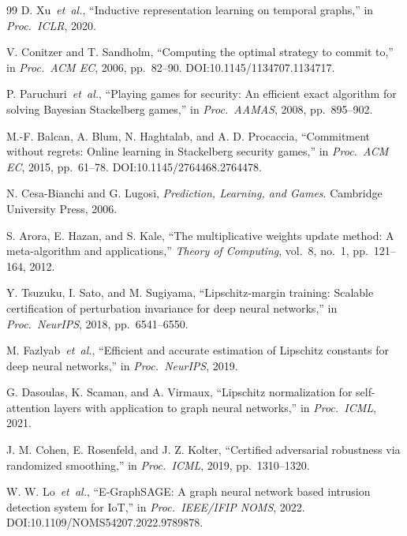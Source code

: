 \documentclass[journal,10pt,twocolumn]{IEEEtran}
\begin{document}
\begin{thebibliography}{99}
 D. Xu~\textit{et~al.}, ``Inductive representation learning on temporal graphs,'' in \textit{Proc.\ ICLR}, 2020.

 V. Conitzer and T. Sandholm, ``Computing the optimal strategy to commit to,'' in \textit{Proc.\ ACM EC}, 2006, pp.~82--90. DOI:10.1145/1134707.1134717.

 P. Paruchuri~\textit{et~al.}, ``Playing games for security: An efficient exact algorithm for solving Bayesian Stackelberg games,'' in \textit{Proc.\ AAMAS}, 2008, pp.~895--902.

 M.-F. Balcan, A. Blum, N. Haghtalab, and A. D. Procaccia, ``Commitment without regrets: Online learning in Stackelberg security games,'' in \textit{Proc.\ ACM EC}, 2015, pp.~61--78. DOI:10.1145/2764468.2764478.

 N. Cesa-Bianchi and G. Lugosi, \textit{Prediction, Learning, and Games}. Cambridge University Press, 2006.

 S. Arora, E. Hazan, and S. Kale, ``The multiplicative weights update method: A meta-algorithm and applications,'' \textit{Theory of Computing}, vol.~8, no.~1, pp.~121--164, 2012.

 Y. Tsuzuku, I. Sato, and M. Sugiyama, ``Lipschitz-margin training: Scalable certification of perturbation invariance for deep neural networks,'' in \textit{Proc.\ NeurIPS}, 2018, pp.~6541--6550.

 M. Fazlyab~\textit{et~al.}, ``Efficient and accurate estimation of Lipschitz constants for deep neural networks,'' in \textit{Proc.\ NeurIPS}, 2019.

 G. Dasoulas, K. Scaman, and A. Virmaux, ``Lipschitz normalization for self-attention layers with application to graph neural networks,'' in \textit{Proc.\ ICML}, 2021.

 J. M. Cohen, E. Rosenfeld, and J. Z. Kolter, ``Certified adversarial robustness via randomized smoothing,'' in \textit{Proc.\ ICML}, 2019, pp.~1310--1320.

 W. W. Lo~\textit{et~al.}, ``E-GraphSAGE: A graph neural network based intrusion detection system for IoT,'' in \textit{Proc.\ IEEE/IFIP NOMS}, 2022. DOI:10.1109/NOMS54207.2022.9789878.


\end{thebibliography}
\end{document}
